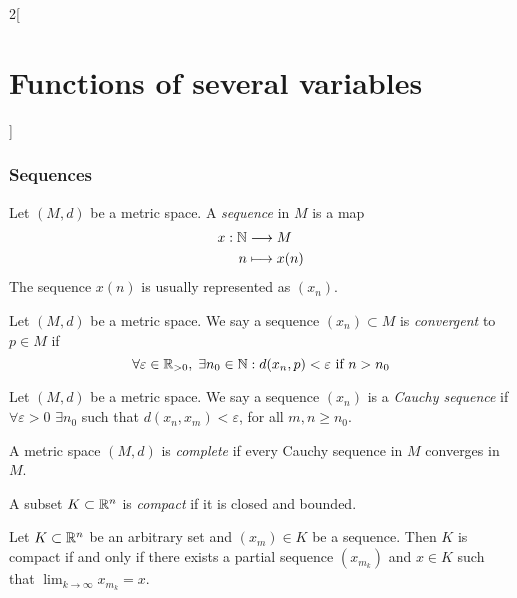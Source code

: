 \documentclass[../../../main.tex]{subfiles}
\begin{document}
\begin{multicols}{2}[\section{Functions of several variables}]
  \subsubsection*{Sequences}
  \begin{definition}
    Let $(M,d)$ be a metric space. A \textit{sequence} in $M$ is a map
    \begin{align*}
      x:\mathbb{N} & \longrightarrow M \\
      n     & \longmapsto x(n)
    \end{align*}
    The sequence $x(n)$ is usually represented as $(x_n)$.
  \end{definition}
  \begin{definition}
    Let $(M,d)$ be a metric space. We say a sequence $(x_n)\subset M$ is \textit{convergent} to $p\in M$ if $$\forall\varepsilon\in\mathbb{R}_{>0},\;\exists n_0\in\mathbb{N} :d(x_n,p)<\varepsilon\text{ if }n>n_0$$
  \end{definition}
  \begin{definition}
    Let $(M,d)$ be a metric space. We say a sequence $(x_n)$ is a \textit{Cauchy sequence} if $\forall\varepsilon>0$ $\exists n_0$ such that $d(x_n,x_m)<\varepsilon$, for all $m,n\geq n_0$.
  \end{definition}
  \begin{definition}
    A metric space $(M,d)$ is \textit{complete} if every Cauchy sequence in $M$ converges in $M$.
    \label{FOSV_complete}
  \end{definition}
  \begin{definition}
    A subset $K\subset\mathbb{R}^n$ is \textit{compact} if it is closed and bounded.
  \end{definition}
  \begin{theorem}
    Let $K\subset\mathbb{R}^n$ be an arbitrary set and $(x_m)\in K$ be a sequence. Then $K$ is compact if and only if there exists a partial sequence $(x_{m_k})$ and $x\in K$ such that $\displaystyle\lim_{k\to\infty}x_{m_k}=x$.
  \end{theorem}

\end{multicols}
\end{document}
